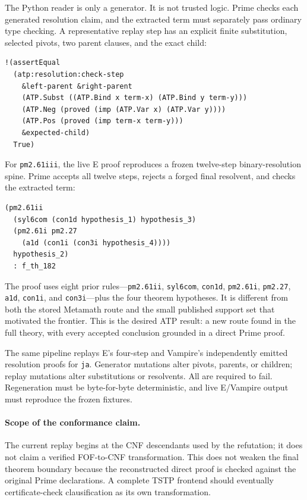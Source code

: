\documentclass[10pt]{article}
\begin{document}
The Python reader is only a generator.  It is not trusted logic.  Prime checks
each generated resolution claim, and the extracted term must separately pass
ordinary type checking.  A representative replay step has an explicit finite
substitution, selected pivots, two parent clauses, and the exact child:

\begin{lstlisting}
!(assertEqual
  (atp:resolution:check-step
    &left-parent &right-parent
    (ATP.Subst ((ATP.Bind x term-x) (ATP.Bind y term-y)))
    (ATP.Neg (proved (imp (ATP.Var x) (ATP.Var y))))
    (ATP.Pos (proved (imp term-x term-y)))
    &expected-child)
  True)
\end{lstlisting}

For \texttt{pm2.61iii}, the live E proof reproduces a frozen twelve-step
binary-resolution spine.  Prime accepts all twelve steps, rejects a forged
final resolvent, and checks the extracted term:

\begin{lstlisting}
(pm2.61ii
  (syl6com (con1d hypothesis_1) hypothesis_3)
  (pm2.61i pm2.27
    (a1d (con1i (con3i hypothesis_4))))
  hypothesis_2)
  : f_th_182
\end{lstlisting}

The proof uses eight prior rules---\texttt{pm2.61ii}, \texttt{syl6com},
\texttt{con1d}, \texttt{pm2.61i}, \texttt{pm2.27}, \texttt{a1d},
\texttt{con1i}, and \texttt{con3i}---plus the four theorem hypotheses.  It is
different from both the stored Metamath route and the small published support
set that motivated the frontier.  This is the desired ATP result: a new route
found in the full theory, with every accepted conclusion grounded in a direct
Prime proof.

The same pipeline replays E's four-step and Vampire's independently emitted
resolution proofs for \texttt{ja}.  Generator mutations alter pivots, parents,
or children; replay mutations alter substitutions or resolvents.  All are
required to fail.  Regeneration must be byte-for-byte deterministic, and live
E/Vampire output must reproduce the frozen fixtures.

\paragraph{Scope of the conformance claim.}
The current replay begins at the CNF descendants used by the refutation; it
does not claim a verified FOF-to-CNF transformation.  This does not weaken the
final theorem boundary because the reconstructed direct proof is checked
against the original Prime declarations.  A complete TSTP frontend should
eventually certificate-check clausification as its own transformation.
\end{document}
